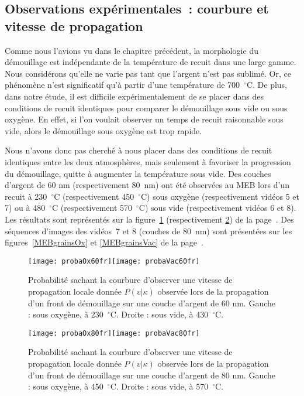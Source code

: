 {{		\subsection{Observations expérimentales~: courbure et vitesse de propagation}
Comme nous l’avions vu dans le chapitre précédent, la morphologie du démouillage est indépendante de la température de recuit dans une large gamme. Nous considérons qu’elle ne varie pas tant que l’argent n’est pas sublimé. Or, ce phénomène n’est significatif qu’à partir d’une température de 700~$^\circ$C. De plus, dans notre étude, il est difficile expérimentalement de se placer dans des conditions de recuit identiques pour comparer le démouillage sous vide ou sous oxygène. En effet, si l’on voulait observer un temps de recuit raisonnable sous vide, alors le démouillage sous oxygène est trop rapide.\par 
Nous n’avons donc pas cherché à nous placer dans des conditions de recuit identiques entre les deux atmosphères, mais seulement à favoriser la progression du démouillage, quitte à augmenter la température sous vide. Des couches d’argent de 60 nm (respectivement 80~nm) ont été observées au MEB lors d’un recuit à 230~$^\circ$C (respectivement 450~$^\circ$C) sous oxygène (respectivement vidéos 5 et 7)  ou à 480~$^\circ$C (respectivement 570~$^\circ$C) sous vide (respectivement vidéos 6 et 8). Les résultats sont représentés sur la figure~\ref{proba60} (respectivement \ref{proba80}) de la page~\pageref{proba60}.
Des séquences d'images des vidéos~7 et 8 (couches de 80~nm) sont présentées sur les figures~\ref{MEBgrainsOx} et \ref{MEBgrainsVac} de la page~\pageref{MEBgrainsOx}.\par 
\begin{figure}[!p]
\centering
\texttt{[image: probaOx60fr]}\texttt{[image: probaVac60fr]}
\caption{Probabilité sachant la courbure d’observer une vitesse de propagation locale donnée $P(v|\kappa)$ observée lors de la propagation d’un front de démouillage sur une couche d’argent de 60 nm. Gauche : sous oxygène, à 230~$^\circ$C. Droite : sous vide, à 430~$^\circ$C.}
\label{proba60}
\end{figure}
\begin{figure}[!p]
\centering
\texttt{[image: probaOx80fr]}\texttt{[image: probaVac80fr]}
\caption{Probabilité sachant la courbure d’observer une vitesse de propagation locale donnée $P(v|\kappa)$ observée lors de la propagation d’un front de démouillage sur une couche d’argent de 80 nm. Gauche : sous oxygène, à 450~$^\circ$C. Droite : sous vide, à 570~$^\circ$C.}
\label{proba80}
\end{figure}

}}
